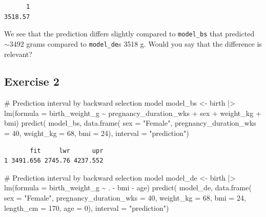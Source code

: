 \documentclass[
  letterpaper,
  DIV=11,
  numbers=noendperiod]{scrreprt}
\newenvironment{Shaded}{\begin{snugshade}}{\end{snugshade}}
\newcommand{\AttributeTok}[1]{\textcolor[rgb]{0.40,0.45,0.13}{#1}}
\newcommand{\CommentTok}[1]{\textcolor[rgb]{0.37,0.37,0.37}{#1}}
\newcommand{\DecValTok}[1]{\textcolor[rgb]{0.68,0.00,0.00}{#1}}
\newcommand{\FunctionTok}[1]{\textcolor[rgb]{0.28,0.35,0.67}{#1}}
\newcommand{\NormalTok}[1]{\textcolor[rgb]{0.00,0.23,0.31}{#1}}
\newcommand{\OtherTok}[1]{\textcolor[rgb]{0.00,0.23,0.31}{#1}}
\newcommand{\SpecialCharTok}[1]{\textcolor[rgb]{0.37,0.37,0.37}{#1}}
\newcommand{\StringTok}[1]{\textcolor[rgb]{0.13,0.47,0.30}{#1}}
\begin{document}
\begin{verbatim}
      1 
3518.57 
\end{verbatim}

We see that the prediction differs slightly compared to
\texttt{model\_bs} that predicted \(\sim 3492\) grams compared to
\texttt{model\_de}s 3518 g. Would you say that the difference is
relevant?

\subsection{Exercise 2}\label{exercise-2-28}

\begin{Shaded}
\begin{Highlighting}[]
\CommentTok{\# Prediction interval by backward selection model}
\NormalTok{model\_bs }\OtherTok{\textless{}{-}}\NormalTok{ birth }\SpecialCharTok{|\textgreater{}} \FunctionTok{lm}\NormalTok{(}\AttributeTok{formula =}\NormalTok{ birth\_weight\_g }\SpecialCharTok{\textasciitilde{}}\NormalTok{ pregnancy\_duration\_wks }\SpecialCharTok{+}\NormalTok{ sex }\SpecialCharTok{+}\NormalTok{ weight\_kg }\SpecialCharTok{+}\NormalTok{ bmi)}
\FunctionTok{predict}\NormalTok{(}
\NormalTok{  model\_bs, }
  \FunctionTok{data.frame}\NormalTok{(}
    \AttributeTok{sex =} \StringTok{"Female"}\NormalTok{, }
    \AttributeTok{pregnancy\_duration\_wks =} \DecValTok{40}\NormalTok{, }
    \AttributeTok{weight\_kg =} \DecValTok{68}\NormalTok{, }
    \AttributeTok{bmi =} \DecValTok{24}\NormalTok{),}
  \AttributeTok{interval =} \StringTok{"prediction"}\NormalTok{)}
\end{Highlighting}
\end{Shaded}

\begin{verbatim}
       fit     lwr      upr
1 3491.656 2745.76 4237.552
\end{verbatim}

\begin{Shaded}
\begin{Highlighting}[]
\CommentTok{\# Prediction interval by backward selection model}
\NormalTok{model\_de }\OtherTok{\textless{}{-}}\NormalTok{ birth }\SpecialCharTok{|\textgreater{}} 
  \FunctionTok{lm}\NormalTok{(}\AttributeTok{formula =}\NormalTok{ birth\_weight\_g }\SpecialCharTok{\textasciitilde{}}\NormalTok{ . }\SpecialCharTok{{-}}\NormalTok{ bmi }\SpecialCharTok{{-}}\NormalTok{ age)}
\FunctionTok{predict}\NormalTok{(}
\NormalTok{  model\_de, }
  \FunctionTok{data.frame}\NormalTok{(}
    \AttributeTok{sex =} \StringTok{"Female"}\NormalTok{, }
    \AttributeTok{pregnancy\_duration\_wks =} \DecValTok{40}\NormalTok{, }
    \AttributeTok{weight\_kg =} \DecValTok{68}\NormalTok{, }
    \AttributeTok{bmi =} \DecValTok{24}\NormalTok{, }
    \AttributeTok{length\_cm =} \DecValTok{170}\NormalTok{, }
    \AttributeTok{age =} \DecValTok{0}\NormalTok{),}
  \AttributeTok{interval =} \StringTok{"prediction"}\NormalTok{)}
\end{Highlighting}
\end{Shaded}
\end{document}

